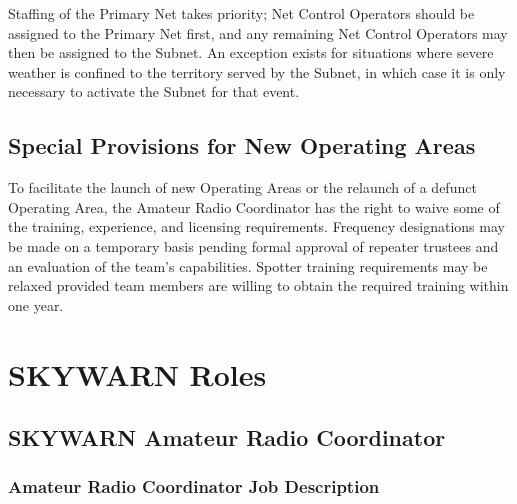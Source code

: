 \documentclass[pdflatex,letterpaper,twoside,12pt]{book}
\begin{document}
Staffing of the Primary Net takes priority;  Net Control Operators should be assigned to the Primary Net first, and any remaining Net Control Operators may then be assigned to the Subnet.  An exception exists for situations where severe weather is confined to the territory served by the Subnet, in which case it is only necessary to activate the Subnet for that event.


\section{Special Provisions for New Operating Areas}

To facilitate the launch of new Operating Areas or the relaunch of a defunct Operating Area, the Amateur Radio Coordinator has the right to waive some of the training, experience, and licensing requirements.  Frequency designations may be made on a temporary basis pending formal approval of repeater trustees and an evaluation of the team's capabilities.  Spotter training requirements may be relaxed provided team members are willing to obtain the required training within one year.


\chapter{SKYWARN Roles}\label{skywarn-roles}


\section{SKYWARN Amateur Radio Coordinator}

\subsection{Amateur Radio Coordinator Job Description}\label{arc-jobdesc}
\end{document}
